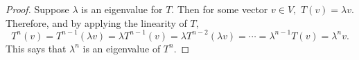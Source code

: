 \begin{proof}
    Suppose $\lambda$ is an eigenvalue for $T.$ Then for some vector $v\in V,$ $T(v)=\lambda v.$ Therefore, and by applying the linearity of $T,$
    $$T^n(v) = T^{n-1}(\lambda v) = \lambda T^{n-1}(v) = \lambda T^{n-2}(\lambda v) = \cdots = \lambda^{n-1} T(v) = \lambda^n v.$$ This says that $\lambda^n$ is an eigenvalue of $T^n.$
\end{proof}